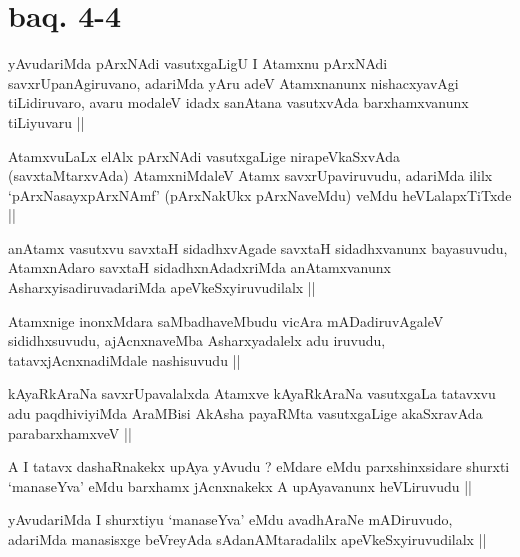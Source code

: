 \stext

\section*{baq. 4-4}


\begin{artha}
yAvudariMda pArxNAdi vasutxgaLigU I Atamxnu pArxNAdi
savxrUpanAgiruvano, adariMda yAru adeV Atamxnanunx nishacxyavAgi
tiLidiruvaro, avaru modaleV idadx sanAtana vasutxvAda barxhamxvanunx
tiLiyuvaru ||
\end{artha}

\begin{artha}
AtamxvuLaLx elAlx pArxNAdi vasutxgaLige nirapeVkaSxvAda
(savxtaMtarxvAda) AtamxniMdaleV Atamx savxrUpaviruvudu, adariMda ililx
`pArxNasayxpArxNAmf' (pArxNakUkx pArxNaveMdu) veMdu heVLalapxTiTxde ||
\end{artha}

\begin{artha}
anAtamx vasutxvu savxtaH sidadhxvAgade savxtaH sidadhxvanunx
bayasuvudu, AtamxnAdaro savxtaH sidadhxnAdadxriMda anAtamxvanunx
AsharxyisadiruvadariMda apeVkeSxyiruvudilalx ||
\end{artha}


\begin{artha}
Atamxnige inonxMdara saMbadhaveMbudu vicAra mADadiruvAgaleV
sididhxsuvudu, ajAcnxnaveMba Asharxyadalelx adu iruvudu,
tatavxjAcnxnadiMdale nashisuvudu || 
\end{artha}


\begin{artha}
kAyaRkAraNa savxrUpavalalxda Atamxve kAyaRkAraNa vasutxgaLa tatavxvu
adu paqdhiviyiMda AraMBisi AkAsha payaRMta vasutxgaLige akaSxravAda
parabarxhamxveV ||
\end{artha}


\begin{artha}
A I tatavx dashaRnakekx upAya yAvudu ? eMdare eMdu parxshinxsidare
shurxti `manaseYva' eMdu barxhamx jAcnxnakekx A upAyavanunx
heVLiruvudu ||
\end{artha}

\begin{artha}
yAvudariMda I shurxtiyu `manaseYva' eMdu avadhAraNe mADiruvudo,
adariMda manasisxge beVreyAda sAdanAMtaradalilx apeVkeSxyiruvudilalx ||
\end{artha}

